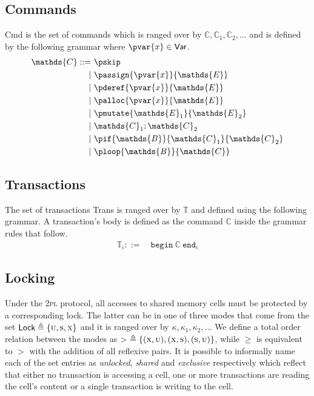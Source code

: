 \subsection{Commands}

\textsf{Cmd} is the set of commands which is ranged over by $\mathds{C}, \mathds{C}_1, \mathds{C}_2, \ldots$ and is defined by the following grammar where $\pvar{x} \in \mathsf{Var}$.
\begin{align*}
\mathds{C} ::=&
\ \pskip \\
|&\ \passign{\pvar{x}}{\mathds{E}} \\
|&\ \pderef{\pvar{x}}{\mathds{E}} \\
|&\ \palloc{\pvar{x}}{\mathds{E}} \\
|&\ \pmutate{\mathds{E}_1}{\mathds{E}_2} \\
|&\ \mathds{C}_1; \mathds{C}_2 \\
|&\ \pif{\mathds{B}}{\mathds{C}_1}{\mathds{C}_2} \\
|&\ \ploop{\mathds{B}}{\mathds{C}}
\end{align*}

\subsection{Transactions}

The set of transactions \textsf{Trans} is ranged over by $\mathds{T}$ and defined using the following grammar. A transaction's body is defined as the command $\mathds{C}$ inside the grammar rules that follow.
\begin{align*}
\mathds{T}_\iota ::=&
\ \mathtt{begin}\ \mathds{C}\ \mathtt{end}_\iota
\end{align*}

\subsection{Locking}

Under the \textsc{2pl} protocol, all accesses to shared memory cells must be protected by a corresponding lock. The latter can be in one of three modes that come from the set $\mathsf{Lock} \triangleq \{ \textsc{u}, \textsc{s}, \textsc{x} \}$ and it is ranged over by $\kappa, \kappa_1, \kappa_2, \ldots$ We define a total order relation between the modes as $>\ \triangleq \{ (\textsc{x}, \textsc{u}), (\textsc{x}, \textsc{s}), (\textsc{s}, \textsc{u}) \}$, while $\geq$ is equivalent to $>$ with the addition of all reflexive pairs. It is possible to informally name each of the set entries as \textit{unlocked}, \textit{shared} and \textit{exclusive} respectively which reflect that either no transaction is accessing a cell, one or more transactions are reading the cell's content or a single transaction is writing to the cell.

